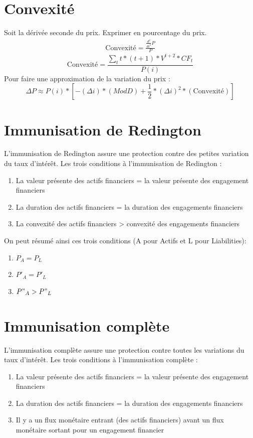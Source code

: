 \documentclass[11pt,french]{report}
\begin{document}
\section{Convexité}
\label{Convexité}

Soit la dérivée seconde du prix. Exprimer en pourcentage du prix.
\begin{align*}
\text{Convexité} = \frac{\frac{d^2}{di^2} P}{P}
\end{align*}
\begin{equation}
\text{Convexité} = \frac{\sum_{t} t * (t+1) * V^{t+2} * CF_{t}}{P(i)}
\end{equation}
Pour faire une approximation de la variation du prix :
\begin{equation}
\Delta P \approx P(i) *[-(\Delta i)*(ModD) + \frac{1}{2}*(\Delta i)^2 *(\text{Convexité})]
\end{equation}

\section{Immunisation de Redington}
\label{sec:immunisation de Redington}

L'immunisation de Redington assure une protection contre des petites variation du taux d'intérêt. Les trois conditions à l'immunisation de Redington :
\begin{enumerate}
\item La valeur présente des actifs financiers = la valeur présente des engagement financiers
\item La duration des actifs financiers = la duration des engagements financiers
\item La convexité des actifs financiers > convexité des engagements financiers
\end{enumerate}

On peut résumé ainsi ces trois conditions (A pour Actifs et L pour Liabilities):
\begin{enumerate}
\item $P_A = P_L$ 
\item $P'_A = P'_L$
\item $P"_A > P"_L$
\end{enumerate}

\section{Immunisation complète}
\label{sec:immunisation complète}

L'immunisation complète assure une protection contre toutes les variations du taux d'intérêt. Les trois conditions à l'immunisation complète :
\begin{enumerate}
\item La valeur présente des actifs financiers = la valeur présente des engagement financiers
\item La duration des actifs financiers = la duration des engagements financiers
\item Il y a un flux monétaire entrant (des actifs financiers) avant un flux monétaire sortant pour un engagement financier
\end{enumerate}
\end{document}
